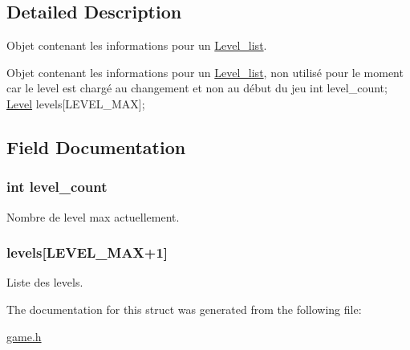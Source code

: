 \subsection{Detailed Description}
Objet contenant les informations pour un \hyperlink{struct_level__list}{Level\+\_\+list}. 

Objet contenant les informations pour un \hyperlink{struct_level__list}{Level\+\_\+list}, non utilisé pour le moment car le level est chargé au changement et non au début du jeu int level\+\_\+count; \hyperlink{struct_level}{Level} levels\mbox{[}L\+E\+V\+E\+L\+\_\+\+M\+AX\mbox{]}; 

\subsection{Field Documentation}
\subsubsection[{\texorpdfstring{level\+\_\+count}{level_count}}]{\setlength{\rightskip}{0pt plus 5cm}int level\+\_\+count}\hypertarget{struct_level__list_a15a1d581c38f5a80cf12ac022ad6c600}{}\label{struct_level__list_a15a1d581c38f5a80cf12ac022ad6c600}
Nombre de level max actuellement. 
\subsubsection[{\texorpdfstring{levels}{levels}}]{ levels\mbox{[}L\+E\+V\+E\+L\+\_\+\+M\+AX+1\mbox{]}}\hypertarget{struct_level__list_a3dc8b993b65462f76626717e082e4e72}{}\label{struct_level__list_a3dc8b993b65462f76626717e082e4e72}
Liste des levels. 

The documentation for this struct was generated from the following file\+:\begin{DoxyCompactItemize}
\item 
\hyperlink{game_8h}{game.\+h}\end{DoxyCompactItemize}
